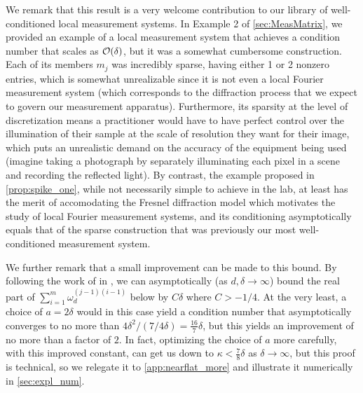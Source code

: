 We remark that this result is a very welcome contribution to our library of well-conditioned local measurement systems.  In Example 2 of \cref{sec:MeasMatrix}, we provided an example of a local measurement system that achieves a condition number that scales as $\mathcal{O}(\delta)$, but it was a somewhat cumbersome construction.  Each of its members $m_j$ was incredibly sparse, having either 1 or 2 nonzero entries, which is somewhat unrealizable since it is not even a local Fourier measurement system (which corresponds to the diffraction process that we expect to govern our measurement apparatus).  Furthermore, its sparsity at the level of discretization means a practitioner would have to have perfect control over the illumination of their sample at the scale of resolution they want for their image, which puts an unrealistic demand on the accuracy of the equipment being used (imagine taking a photograph by separately illuminating each pixel in a scene and recording the reflected light).  By contrast, the example proposed in \cref{prop:spike_one}, while not necessarily simple to achieve in the lab, at least has the merit of accomodating the Fresnel diffraction model which motivates the study of local Fourier measurement systems, and its conditioning asymptotically equals that of the sparse construction that was previously our most well-conditioned measurement system.

We further remark that a small improvement can be made to this bound.  By following the work of \citeauthor{mercerXXXXdirichlet} in \cite{mercerXXXXdirichlet}, we can asymptotically (as $d, \delta \to \infty$) bound the real part of $\sum_{i = 1}^m \omega_d^{(j - 1)(i - 1)}$ below by $C \delta$ where $C > - 1 / 4$.  At the very least, a choice of $a = 2 \delta$ would in this case yield a condition number that asymptotically converges to no more than $4 \delta^2 / (7 / 4 \delta) = \frac{16}{7} \delta$, but this yields an improvement of no more than a factor of $2$.  In fact, optimizing the choice of $a$ more carefully, with this improved constant, can get us down to $\kappa < \frac{7}{8} \delta$ as $\delta \to \infty$, but this proof is technical, so we relegate it to \cref{app:nearflat_more} and illustrate it numerically in \cref{sec:expl_num}.


